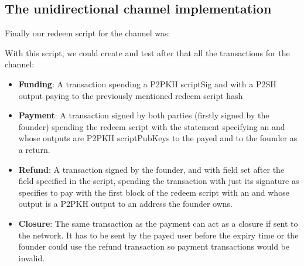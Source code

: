 \subsection{The unidirectional channel implementation}
Finally our redeem script for the channel was:
\begin{center}
\end{center}
With this script, we could create and test after that all the transactions for the channel:
\begin{itemize}
    \item \textbf{Funding}: A transaction spending a P2PKH scriptSig and with a P2SH output paying to the previously mentioned redeem script hash
    \item \textbf{Payment}: A transaction signed by both parties (firstly signed by the founder) spending the redeem script with the  statement specifying an  and whose outputs are P2PKH scriptPubKeys to the payed and to the founder as a return.
    \item \textbf{Refund}: A transaction signed by the founder, and with  field set after the  field specified in the script, spending the transaction with just its signature as specifies to pay with the first block of the redeem script with an  and whose output is a P2PKH output to an address the founder owns.
    \item \textbf{Closure}: The same transaction as the payment can act as a closure if sent to the network. It has to be sent by the payed user before the expiry time or the founder could use the refund transaction so payment transactions would be invalid.
\end{itemize}